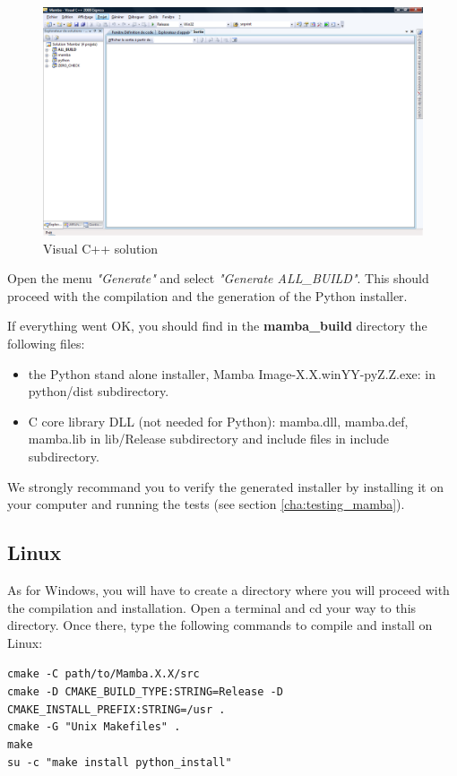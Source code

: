\documentclass[a4paper,10pt,oneside]{article}
\begin{document}
\begin{figure}
\centering
\includegraphics[scale=0.3]{images/visualcpp.png}
\caption{Visual C++ solution}
\label{fig:visualcpp}
\end{figure}

Open the menu \textit{"Generate"} and select \textit{"Generate ALL\_BUILD"}.
This should proceed with the compilation and the generation of the Python installer.

If everything went OK, you should find in the \textbf{mamba\_build} directory
the following files:
\begin{itemize}
\item the Python stand alone installer, Mamba Image-X.X.winYY-pyZ.Z.exe: in python/dist subdirectory.
\item C core library DLL (not needed for Python): mamba.dll, mamba.def, mamba.lib in lib/Release subdirectory
and include files in include subdirectory.
\end{itemize}

We strongly recommand you to verify the generated installer by installing it on
your computer and running the tests (see section \ref{cha:testing_mamba}).

\subsection{Linux}

As for Windows, you will have to create a directory where you will proceed with
the compilation and installation. Open a terminal and cd your way to this 
directory. Once there, type the following commands to compile and install on Linux:

\texttt{cmake -C path/to/Mamba.X.X/src}\\
\texttt{cmake -D CMAKE\_BUILD\_TYPE:STRING=Release -D CMAKE\_INSTALL\_PREFIX:STRING=/usr .}\\
\texttt{cmake -G "Unix Makefiles" .}\\
\texttt{make}\\
\texttt{su -c "make install python\_install"}
\end{document}
